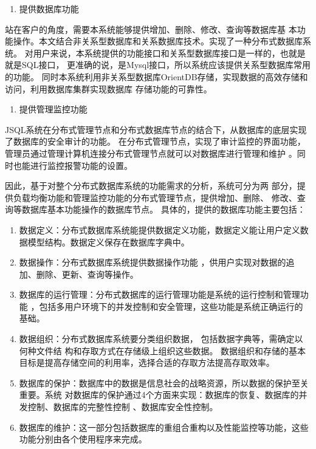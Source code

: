 	\begin{enumerate}[resume]
		\item 提供数据库功能
	\end{enumerate}

	站在客户的角度，需要本系统能够提供增加、删除、修改、查询等数据库基
	本功能操作。本文结合非关系型数据库和关系数据库技术。实现了一种分布式数据库系统。
	对用户来说，本系统提供的功能接口和关系型数据库接口是一样的，也就是就是SQL接口，
	更准确的说，是Mysql接口，所以系统应该提供关系型数据库常用的功能。
	同时本系统利用非关系型数据库OrientDB存储，实现数据的高效存储和访问，利用数据库集群实现数据库
	存储功能的可靠性。
	
	\begin{enumerate}[resume]
		\item 提供管理监控功能
	\end{enumerate}

	JSQL系统在分布式管理节点和分布式数据库节点的结合下，从数据库的底层实现了数据库的安全审计的功能。
	在分布式管理节点，实现了审计监控的界面功能，管理员通过管理计算机连接分布式管理节点就可以对数据库进行管理和维护
	。同时也能进行监控报警功能的设置。


	因此，基于对整个分布式数据库系统的功能需求的分析，系统可分为两
	部分，提供负载均衡功能和管理监控功能的分布式管理节点，提供增加、删除、
	修改、查询等数据库基本功能操作的数据库节点。
具体的，提供的数据库功能主要包括：
\begin{enumerate}[fullwidth,itemindent=2em,listparindent=2em]
	\item 数据定义：分布式数据库系统能提供数据定义功能，数据定义能让用户定义数据模型结构。数据定义保存在数据库字典中。
	\item 数据操作：分布式数据库系统提供数据操作功能
	，供用户实现对数据的追加、删除、更新、查询等操作。
	\item 数据库的运行管理：分布式数据库的运行管理功能是系统的运行控制和管理功能
	，包括多用户环境下的并发控制和安全管理，这些功能是系统正确运行的基础。
	\item 数据组织：分布式数据库系统要分类组织数据，
	包括数据字典等，需确定以何种文件结
	构和存取方式在存储级上组织这些数据。
	数据组织和存储的基本目标是提高存储空间的利用率，选择合适的存取方法提高存取效率。
	\item   数据库的保护：数据库中的数据是信息社会的战略资源，所以数据的保护至关重要。系统
	对数据库的保护通过4个方面来实现：数据库的恢复、数据库的并发控制、数据库的完整性控制
	、数据库安全性控制。
	\item  数据库的维护：这一部分包括数据库的重组合重构以及性能监控等功能，这些功能分别由各个使用程序来完成。
\end{enumerate}
